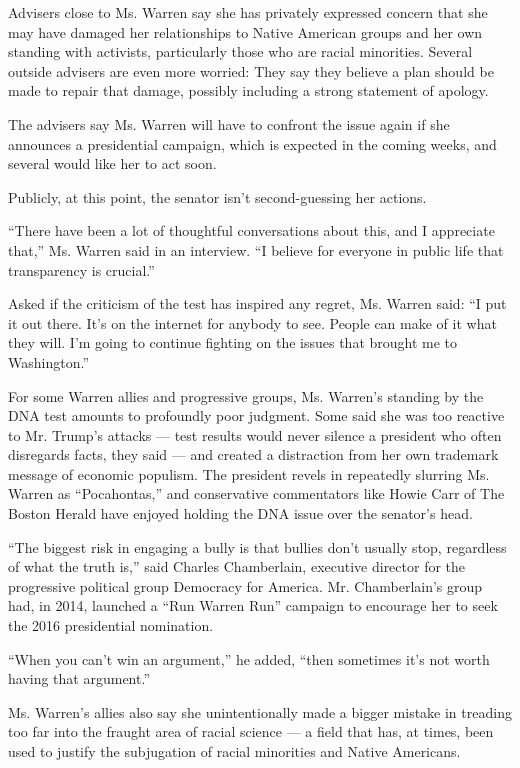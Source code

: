Advisers close to Ms. Warren say she has privately expressed concern
that she may have damaged her relationships to Native American groups
and her own standing with activists, particularly those who are racial
minorities. Several outside advisers are even more worried: They say
they believe a plan should be made to repair that damage, possibly
including a strong statement of apology.

The advisers say Ms. Warren will have to confront the issue again if she
announces a presidential campaign, which is expected in the coming
weeks, and several would like her to act soon.

Publicly, at this point, the senator isn't second-guessing her actions.

``There have been a lot of thoughtful conversations about this, and I
appreciate that,'' Ms. Warren said in an interview. ``I believe for
everyone in public life that transparency is crucial.''

Asked if the criticism of the test has inspired any regret, Ms. Warren
said: ``I put it out there. It's on the internet for anybody to see.
People can make of it what they will. I'm going to continue fighting on
the issues that brought me to Washington.''

For some Warren allies and progressive groups, Ms. Warren's standing by
the DNA test amounts to profoundly poor judgment. Some said she was too
reactive to Mr. Trump's attacks --- test results would never silence a
president who often disregards facts, they said --- and created a
distraction from her own trademark message of economic populism. The
president revels in repeatedly slurring Ms. Warren as ``Pocahontas,''
and conservative commentators like Howie Carr of The Boston Herald have
enjoyed holding the DNA issue over the senator's head.

``The biggest risk in engaging a bully is that bullies don't usually
stop, regardless of what the truth is,'' said Charles Chamberlain,
executive director for the progressive political group Democracy for
America. Mr. Chamberlain's group had, in 2014, launched a ``Run Warren
Run'' campaign to encourage her to seek the 2016 presidential
nomination.

``When you can't win an argument,'' he added, ``then sometimes it's not
worth having that argument.''

Ms. Warren's allies also say she unintentionally made a bigger mistake
in treading too far into the fraught area of racial science --- a field
that has, at times, been used to justify the subjugation of racial
minorities and Native Americans.


